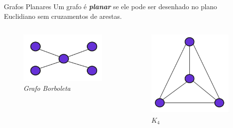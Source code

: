 \begin{frame}{Grafos Planares}
    \centering\Large
    Um grafo é \textbf{\emph{planar}} se ele pode ser desenhado no plano Euclidiano sem cruzamentos de arestas.
    \bigbreak
    
    \begin{columns}
        \begin{figure}
            \includegraphics[width=0.9\linewidth]{images/butterfly_graph.jpg}
            \caption*{\textit{Grafo Borboleta}}
        \end{figure}
    
        \begin{figure}
            \includegraphics[width=0.9\linewidth]{images/k4_graph.jpg}
            \caption*{\textit{$K_4$}}
        \end{figure}
    \end{columns}
\end{frame}

